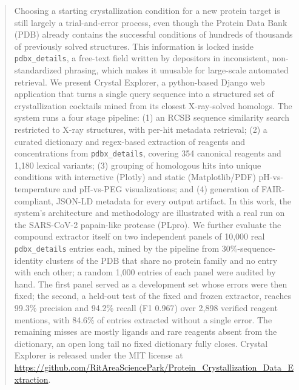\maketitle
\pagestyle{plain}

\begin{abstract}
Choosing a starting crystallization condition for a new protein target is still largely a trial-and-error process, even though the Protein Data Bank (PDB) already contains the successful conditions of hundreds of thousands of previously solved structures. This information is locked inside \texttt{pdbx\_details}, a free-text field written by depositors in inconsistent, non-standardized phrasing, which makes it unusable for large-scale automated retrieval. We present Crystal Explorer, a python-based Django web application that turns a single query sequence into a structured set of crystallization cocktails mined from its closest X-ray-solved homologs. The system runs a four stage pipeline: (1) an RCSB sequence similarity search restricted to X-ray structures, with per-hit metadata retrieval; (2) a curated dictionary and regex-based extraction of reagents and concentrations from \texttt{pdbx\_details}, covering 354 canonical reagents and 1{,}180 lexical variants; (3) grouping of homologous hits into unique conditions with interactive (Plotly) and static (Matplotlib/PDF) pH-vs-temperature and pH-vs-PEG visualizations; and (4) generation of FAIR-compliant, JSON-LD metadata for every output artifact. In this work, the system's architecture and methodology are illustrated with a real run on the SARS-CoV-2 papain-like protease (PLpro). We further evaluate the compound extractor itself on two independent panels of 10{,}000 real \texttt{pdbx\_details} entries each, mined by the pipeline from 30\%-sequence-identity clusters of the PDB that share no protein family and no entry with each other; a random 1{,}000 entries of each panel were audited by hand. The first panel served as a development set whose errors were then fixed; the second, a held-out test of the fixed and frozen extractor, reaches 99.3\% precision and 94.2\% recall (F1 0.967) over 2{,}898 verified reagent mentions, with 84.6\% of entries extracted without a single error. The remaining misses are mostly ligands and rare reagents absent from the dictionary, an open long tail no fixed dictionary fully closes. Crystal Explorer is released under the MIT license at
\url{https://github.com/RitAreaSciencePark/Protein_Crystallization_Data_Extraction}.
\end{abstract}


